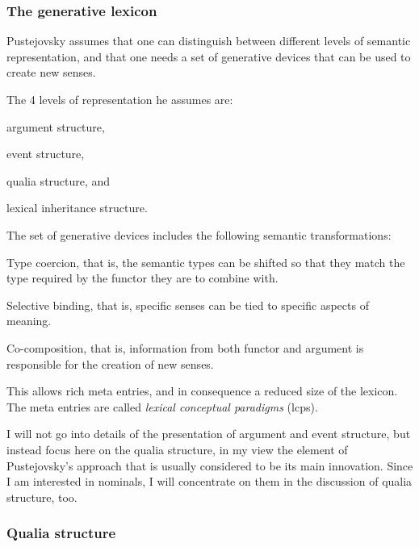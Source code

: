 \subsubsection{The generative lexicon}
\label{sec:puste_gen}

Pustejovsky assumes that one can distinguish between different levels
of semantic representation, and that one needs a set of generative
devices that can be used to create new senses.

The 4 levels of representation he assumes are:
  \begin{inparaenum}[(1)]
  \item argument structure,
  \item event structure,
  \item qualia structure, and
  \item lexical inheritance structure.
  \end{inparaenum}

The set of generative devices includes the following semantic transformations:
  \begin{inparaenum}[(1)]
  \item Type coercion, that is, the semantic types can be shifted so that they
    match the type required by the functor they are to combine with.
  \item Selective binding, that is, specific senses can be tied to
    specific aspects of meaning.
  \item Co-composition, that is, information from both functor and argument is
    responsible for the creation of new senses.
  \end{inparaenum}

This allows rich meta entries, and in consequence a reduced size of the
  lexicon.  The meta entries are called \emph{lexical conceptual
    paradigms} (lcps). 

I will not go into details of the presentation of argument and event
structure, but instead focus here on the qualia structure, in my view
the element of Pustejovsky's approach that is usually considered to
be its main innovation. Since I am interested in nominals, I will
concentrate on them in the discussion of qualia structure, too.

\subsubsection{Qualia structure}
\label{sec:qualia-structure}

